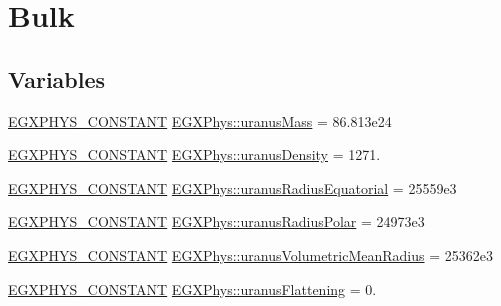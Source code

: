 \hypertarget{group___e_g_x_phys-_constants-_astrophysics-_solar_system-_uranus-_bulk}{}\section{Bulk}
\label{group___e_g_x_phys-_constants-_astrophysics-_solar_system-_uranus-_bulk}
\subsection*{Variables}
\begin{DoxyCompactItemize}
\item 
\mbox{\hyperlink{group___e_g_x_phys-_constants-_macros_ga76980d288494ce1714c9ac68a95ba702}{E\+G\+X\+P\+H\+Y\+S\+\_\+\+C\+O\+N\+S\+T\+A\+NT}} \mbox{\hyperlink{group___e_g_x_phys-_constants-_astrophysics-_solar_system-_uranus-_bulk_gaccabd738d57e4f5b6dc7b88d67b2cace}{E\+G\+X\+Phys\+::uranus\+Mass}} = 86.\+813e24
\item 
\mbox{\hyperlink{group___e_g_x_phys-_constants-_macros_ga76980d288494ce1714c9ac68a95ba702}{E\+G\+X\+P\+H\+Y\+S\+\_\+\+C\+O\+N\+S\+T\+A\+NT}} \mbox{\hyperlink{group___e_g_x_phys-_constants-_astrophysics-_solar_system-_uranus-_bulk_gaffdc8522dc72ce6a2c81fbae2720794f}{E\+G\+X\+Phys\+::uranus\+Density}} = 1271.
\item 
\mbox{\hyperlink{group___e_g_x_phys-_constants-_macros_ga76980d288494ce1714c9ac68a95ba702}{E\+G\+X\+P\+H\+Y\+S\+\_\+\+C\+O\+N\+S\+T\+A\+NT}} \mbox{\hyperlink{group___e_g_x_phys-_constants-_astrophysics-_solar_system-_uranus-_bulk_ga8610758fe64ac622528c0b951dd90e23}{E\+G\+X\+Phys\+::uranus\+Radius\+Equatorial}} = 25559e3
\item 
\mbox{\hyperlink{group___e_g_x_phys-_constants-_macros_ga76980d288494ce1714c9ac68a95ba702}{E\+G\+X\+P\+H\+Y\+S\+\_\+\+C\+O\+N\+S\+T\+A\+NT}} \mbox{\hyperlink{group___e_g_x_phys-_constants-_astrophysics-_solar_system-_uranus-_bulk_ga91b85385fee1afe5a4df54e4b4cbe7ad}{E\+G\+X\+Phys\+::uranus\+Radius\+Polar}} = 24973e3
\item 
\mbox{\hyperlink{group___e_g_x_phys-_constants-_macros_ga76980d288494ce1714c9ac68a95ba702}{E\+G\+X\+P\+H\+Y\+S\+\_\+\+C\+O\+N\+S\+T\+A\+NT}} \mbox{\hyperlink{group___e_g_x_phys-_constants-_astrophysics-_solar_system-_uranus-_bulk_gae20d0e7177a2cc5b86297f1ab2cf8400}{E\+G\+X\+Phys\+::uranus\+Volumetric\+Mean\+Radius}} = 25362e3
\item 
\mbox{\hyperlink{group___e_g_x_phys-_constants-_macros_ga76980d288494ce1714c9ac68a95ba702}{E\+G\+X\+P\+H\+Y\+S\+\_\+\+C\+O\+N\+S\+T\+A\+NT}} \mbox{\hyperlink{group___e_g_x_phys-_constants-_astrophysics-_solar_system-_uranus-_bulk_gae10777496d6d1804e98530f68dcbe150}{E\+G\+X\+Phys\+::uranus\+Flattening}} = 0.

\end{DoxyCompactItemize}
